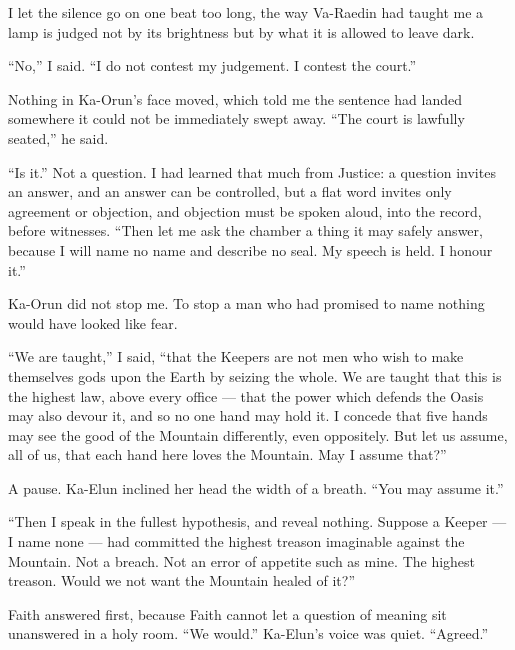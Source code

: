 \ornament
 
I let the silence go on one beat too long, the way Va-Raedin had taught me a lamp is judged not by its brightness but by what it is allowed to leave dark.\par
 
``No,'' I said. ``I do not contest my judgement. I contest the court.''\par
 
Nothing in Ka-Orun's face moved, which told me the sentence had landed somewhere it could not be immediately swept away. ``The court is lawfully seated,'' he said.\par
 
``Is it.'' Not a question. I had learned that much from Justice: a question invites an answer, and an answer can be controlled, but a flat word invites only agreement or objection, and objection must be spoken aloud, into the record, before witnesses. ``Then let me ask the chamber a thing it may safely answer, because I will name no name and describe no seal. My speech is held. I honour it.''\par
 
Ka-Orun did not stop me. To stop a man who had promised to name nothing would have looked like fear.\par
 
``We are taught,'' I said, ``that the Keepers are not men who wish to make themselves gods upon the Earth by seizing the whole. We are taught that this is the highest law, above every office — that the power which defends the Oasis may also devour it, and so no one hand may hold it. I concede that five hands may see the good of the Mountain differently, even oppositely. But let us assume, all of us, that each hand here loves the Mountain. May I assume that?''\par
 
A pause. Ka-Elun inclined her head the width of a breath. ``You may assume it.''\par
 
``Then I speak in the fullest hypothesis, and reveal nothing. Suppose a Keeper — I name none — had committed the highest treason imaginable against the Mountain. Not a breach. Not an error of appetite such as mine. The highest treason. Would we not want the Mountain healed of it?''\par
 
Faith answered first, because Faith cannot let a question of meaning sit unanswered in a holy room. ``We would.'' Ka-Elun's voice was quiet. ``Agreed.''\par

